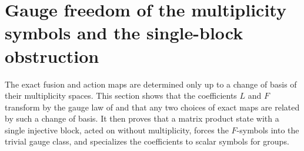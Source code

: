 \section{Gauge freedom of the multiplicity symbols and the single-block obstruction}
\label{sec:glm_mixed_gauge}

The exact fusion and action maps are determined only up to a change of basis
of their multiplicity spaces. This section shows that the coefficients $L$
and $F$ transform by the gauge law of \cite[Section~3]{GarreRubio2023MPOSym}
and that any two choices of exact maps are related by such a change of basis.
It then proves that a matrix product state with a single injective block,
acted on without multiplicity, forces the $F$-symbols into the trivial gauge
class, and specializes the coefficients to scalar symbols for groups.

